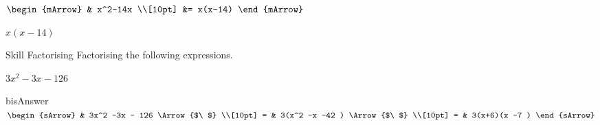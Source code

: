 \begin{mtask}[resume]
\begin{exercise}
\begin{envSolution}
			      $\begin{mArrow}
			        & x^2-14x                       \\[10pt]    
					&= x(x-14) 
				 \end{mArrow}$
                 \begin{shortsolution}  
				       $x(x-14)$
			     \end{shortsolution}				 
               \end{envSolution}
         \end{exercise}
		 
\end{mtask}


\begin{boxSkill}{Skill   \thenskill \quad Factorising}
       Factorising the following expressions.
\begin{tasksample}
	\task[] $3x^2-3x-126$
              \begin{envOut}[equal height group=hRevF1]{bisAnswer}
			       $\begin{sArrow}
			              & 3x^2 -3x  - 126      \Arrow{$\ $} \\[10pt]
                       =  & 3(x^2 -x -42 )       \Arrow{$\ $} \\[10pt]
					   =  & 3(x+6)(x -7 )
	                \end{sArrow}$
              \end{envOut}%
\end{tasksample}
\end{boxSkill}
\clearpage\noindent%
